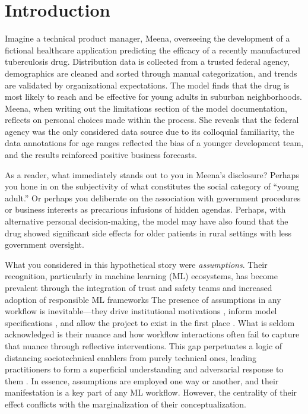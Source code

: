 \section{Introduction}

Imagine a technical product manager, Meena, overseeing the development of a fictional healthcare application predicting the efficacy of a recently manufactured tuberculosis drug. Distribution data is collected from a trusted federal agency, demographics are cleaned and sorted through manual categorization, and trends are validated by organizational expectations. The model finds that the drug is most likely to reach and be effective for young adults in suburban neighborhoods. Meena, when writing out the limitations section of the model documentation, reflects on personal choices made within the process. She reveals that the federal agency was the only considered data source due to its colloquial familiarity, the data annotations for age ranges reflected the bias of a younger development team, and the results reinforced positive business forecasts. 

As a reader, what immediately stands out to you in Meena's disclosure? Perhaps you hone in on the subjectivity of what constitutes the social category of ``young adult.'' Or perhaps you deliberate on the association with government procedures or business interests as precarious infusions of hidden agendas. Perhaps, with alternative personal decision-making, the model may have also found that the drug showed significant side effects for older patients in rural settings with less government oversight.

What you considered in this hypothetical story were \textit{assumptions}. Their recognition, particularly in machine learning (ML) ecosystems, has become prevalent through the integration of trust and safety teams and increased adoption of responsible ML frameworks  The presence of assumptions in any workflow is inevitable---they drive institutional motivations , inform model specifications , and allow the project to exist in the first place \cite{mitchell2021algorithmic,kilbertus2021beyond,malik2020hierarchy,saxena2021framework}. What is seldom acknowledged is their nuance and how workflow interactions often fail to capture that nuance through reflective interventions. This gap perpetuates a logic of distancing sociotechnical enablers from purely technical ones, leading practitioners to form a superficial understanding and adversarial response to them . In essence, assumptions are employed one way or another, and their manifestation is a key part of any ML workflow. However, the centrality of their effect conflicts with the marginalization of their conceptualization.

